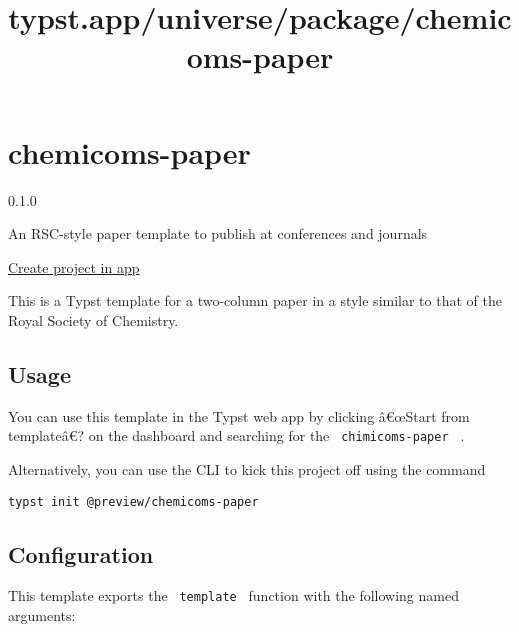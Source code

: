 \title{typst.app/universe/package/chemicoms-paper}

\label{banner}
\label{template-thumbnail}

\section{chemicoms-paper}\label{chemicoms-paper}

{ 0.1.0 }

An RSC-style paper template to publish at conferences and journals

\href{/app?template=chemicoms-paper&version=0.1.0}{Create project in
app}

\label{readme}
This is a Typst template for a two-column paper in a style similar to
that of the Royal Society of Chemistry.

\subsection{Usage}\label{usage}

You can use this template in the Typst web app by clicking â€œStart from
templateâ€? on the dashboard and searching for the
\texttt{\ chimicoms-paper\ } .

Alternatively, you can use the CLI to kick this project off using the
command

\begin{verbatim}
typst init @preview/chemicoms-paper
\end{verbatim}

\subsection{Configuration}\label{configuration}

This template exports the \texttt{\ template\ } function with the
following named arguments:

